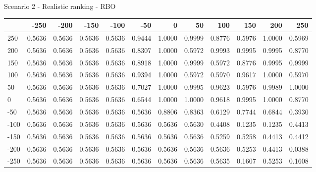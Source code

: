 Scenario 2 - Realistic ranking - RBO
\begin{tabular}{lrrrrrrrrrrr}
\toprule
{} &   -250 &   -200 &   -150 &   -100 &   -50  &    0   &    50  &    100 &    150 &    200 &    250 \\
\midrule
 250 & 0.5636 & 0.5636 & 0.5636 & 0.5636 & 0.9444 & 1.0000 & 0.9999 & 0.8776 & 0.5976 & 1.0000 & 0.5969 \\
 200 & 0.5636 & 0.5636 & 0.5636 & 0.5636 & 0.8307 & 1.0000 & 0.5972 & 0.9993 & 0.9995 & 0.9995 & 0.8770 \\
 150 & 0.5636 & 0.5636 & 0.5636 & 0.5636 & 0.8918 & 1.0000 & 0.9999 & 0.5972 & 0.8776 & 0.9995 & 0.9999 \\
 100 & 0.5636 & 0.5636 & 0.5636 & 0.5636 & 0.9394 & 1.0000 & 0.5972 & 0.5970 & 0.9617 & 1.0000 & 0.5970 \\
 50  & 0.5636 & 0.5636 & 0.5636 & 0.5636 & 0.7027 & 1.0000 & 0.9995 & 0.9623 & 0.5976 & 0.9989 & 1.0000 \\
 0   & 0.5636 & 0.5636 & 0.5636 & 0.5636 & 0.6544 & 1.0000 & 1.0000 & 0.9618 & 0.9995 & 1.0000 & 0.8770 \\
-50  & 0.5636 & 0.5636 & 0.5636 & 0.5636 & 0.5636 & 0.8806 & 0.8363 & 0.6129 & 0.7744 & 0.6844 & 0.3930 \\
-100 & 0.5636 & 0.5636 & 0.5636 & 0.5636 & 0.5636 & 0.5636 & 0.5630 & 0.4408 & 0.1235 & 0.1235 & 0.4413 \\
-150 & 0.5636 & 0.5636 & 0.5636 & 0.5636 & 0.5636 & 0.5636 & 0.5636 & 0.5259 & 0.5258 & 0.4413 & 0.4412 \\
-200 & 0.5636 & 0.5636 & 0.5636 & 0.5636 & 0.5636 & 0.5636 & 0.5636 & 0.5636 & 0.5253 & 0.4413 & 0.0388 \\
-250 & 0.5636 & 0.5636 & 0.5636 & 0.5636 & 0.5636 & 0.5636 & 0.5636 & 0.5635 & 0.1607 & 0.5253 & 0.1608 \\
\bottomrule
\end{tabular}

